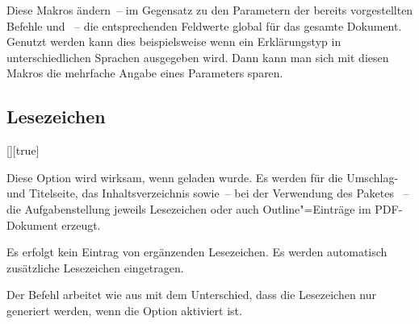 \begin{Declaration}{}
\begin{Declaration}{}
\begin{Declaration}{}
\begin{Declaration}{}
\printdeclarationlist%
%
%
Diese Makros ändern~-- im Gegensatz zu den Parametern der bereits vorgestellten 
Befehle  und ~-- die entsprechenden 
Feldwerte global für das gesamte Dokument. Genutzt werden kann dies 
beispielsweise wenn ein Erklärungstyp in unterschiedlichen Sprachen ausgegeben 
wird. Dann kann man sich mit diesen Makros die mehrfache Angabe eines 
Parameters sparen.
\end{Declaration}
\end{Declaration}
\end{Declaration}
\end{Declaration}


\subsection{Lesezeichen}
\begin{Declaration}{[\PBoolean]}[true]%
\begin{Declaration}{%
}%
\printdeclarationlist%
%
%
%
%
Diese Option wird wirksam, wenn  geladen wurde. Es werden für 
die Umschlag- und Titelseite, das Inhaltsverzeichnis sowie~-- bei der 
Verwendung des Paketes ~-- die Aufgabenstellung 
jeweils Lesezeichen oder auch Outline"=Einträge im PDF-Dokument erzeugt.
%
\begin{values}
\itemfalse
  Es erfolgt kein Eintrag von ergänzenden Lesezeichen.
\itemtrue*
  Es werden automatisch zusätzliche Lesezeichen eingetragen.
\end{values}
%
Der Befehl  arbeitet wie  aus 
 mit dem Unterschied, dass die Lesezeichen nur generiert 
werden, wenn die Option  aktiviert ist.
\end{Declaration}
\end{Declaration}



